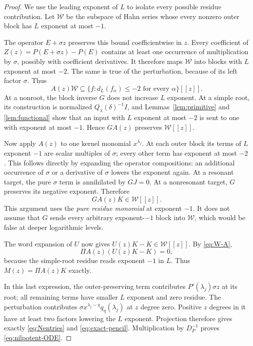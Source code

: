 \documentclass[11pt,a4paper]{article}
\numberwithin{equation}{section}
\theoremstyle{definition}
\theoremstyle{remark}
\theoremstyle{definition}
\newcommand{\dl}{d_L}
\begin{document}
\begin{proof}
We use the leading exponent of $L$ to isolate every possible residue contribution. Let $\mathcal W$ be the subspace of Hahn series whose every nonzero outer block has $L$ exponent at most $-1$.

The operator $E+\sigma z$ preserves this bound coefficientwise in $z$. Every coefficient of $Z(z)=P(E+\sigma z)-P(E)$ contains at least one occurrence of multiplication by $\sigma$, possibly with coefficient derivatives. It therefore maps $\mathcal W$ into blocks with $L$ exponent at most $-2$. The same is true of the perturbation, because of its left factor $\sigma$. Thus
\begin{equation}
 A(z)\mathcal W\subseteq\{f:\dl(f_\alpha)\le-2
 \text{ for every }\alpha\}[[z]].
 \label{eq:W-A}
\end{equation}
At a nonroot, the block inverse $G$ does not increase $L$ exponent. At a simple root, its construction is normalized $Q_\lambda(\delta)^{-1}I$, and Lemmas~\ref{lem:primitive} and \ref{lem:functional} show that an input with $L$ exponent at most $-2$ is sent to one with exponent at most $-1$. Hence $GA(z)$ preserves $\mathcal W[[z]]$.

Now apply $A(z)$ to one kernel monomial $x^{\lambda_j}$. At each outer block its terms of $L$ exponent $-1$ are scalar multiples of $\sigma$; every other term has exponent at most $-2$. This follows directly by expanding the operator compositions: an additional occurrence of $\sigma$ or a derivative of $\sigma$ lowers the exponent again. At a resonant target, the pure $\sigma$ term is annihilated by $GJ=0$. At a nonresonant target, $G$ preserves its negative exponent. Therefore
\[
 GA(z)K\in\mathcal W[[z]].
\]
This argument uses the \emph{pure residue monomial} at exponent $-1$. It does not assume that $G$ sends every arbitrary exponent-$-1$ block into $\mathcal W$, which would be false at deeper logarithmic levels.

The word expansion of $U$ now gives $U(z)K-K\in\mathcal W[[z]]$. By \eqref{eq:W-A},
\[
 \Pi A(z)(U(z)K-K)=0,
\]
because the simple-root residue reads exponent $-1$ in $L$. Thus $M(z)=\Pi A(z)K$ exactly.

In this last expression, the outer-preserving term contributes $P'(\lambda_j)\sigma z$ at its root; all remaining terms have smaller $L$ exponent and zero residue. The perturbation contributes $\sigma x^{\lambda_j-\eta}q_\eta(\lambda_j)$ at $z$ degree zero. Positive $z$ degrees in it have at least two factors lowering the $L$ exponent. Projection therefore gives exactly \eqref{eq:Nentries} and \eqref{eq:exact-pencil}. Multiplication by $D_P^{-1}$ proves \eqref{eq:nilpotent-ODE}.
\end{proof}
\end{document}
